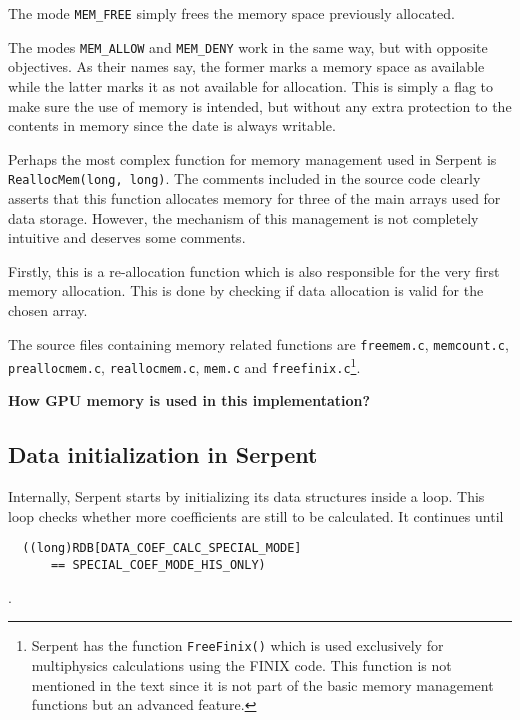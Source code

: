 \documentclass[twoside,a4paper,12pt,english]{anstrans}
\begin{document}
%

The mode \texttt{MEM\_FREE} simply frees the memory space previously allocated.

The modes \texttt{MEM\_ALLOW} and \texttt{MEM\_DENY} work in the same way, but with opposite objectives. As
their names say, the former marks a memory space%
as available while the latter marks it as not available for allocation. This is simply a flag to make sure
the use of memory is intended, but without any extra protection to the contents in memory since the
date is always writable.

Perhaps the most complex function for memory management used in Serpent is \texttt{ReallocMem(long, long)}.
The comments included in the source code clearly asserts that this function allocates memory for
three of the main arrays used for data storage. However, the mechanism of this management is not
completely intuitive and deserves some comments.

Firstly, this is a re-allocation function which is also responsible for the very first memory
allocation. This is done by checking if data allocation is valid for the chosen array.

The source files containing memory related functions are \texttt{freemem.c},
\texttt{memcount.c}, \texttt{preallocmem.c}, \texttt{reallocmem.c}, \texttt{mem.c}
and \texttt{freefinix.c}\footnote{Serpent has the function \texttt{FreeFinix()} which
  is used exclusively for multiphysics calculations using the FINIX code. This function
  is not mentioned in the text since it is not part of the basic memory management functions
  but an advanced feature.}.


\textbf{How GPU memory is used in this implementation?}

\subsection{Data initialization in Serpent}
Internally, Serpent starts by initializing its data structures inside a loop. This loop checks
whether more coefficients are still to be calculated. It continues until \begin{verbatim}
  ((long)RDB[DATA_COEF_CALC_SPECIAL_MODE]
      == SPECIAL_COEF_MODE_HIS_ONLY)
\end{verbatim}.
\end{document}
